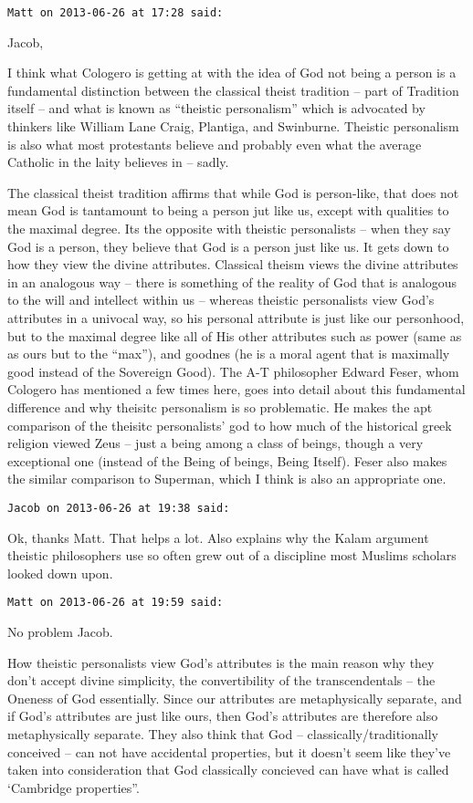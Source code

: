 \begin{footnotesize}
\begin{sffamily}
\hfill

\texttt{Matt on 2013-06-26 at 17:28 said: }

Jacob,

I think what Cologero is getting at with the idea of God not being a person is a fundamental distinction between the classical theist tradition – part of Tradition itself – and what is known as “theistic personalism” which is advocated by thinkers like William Lane Craig, Plantiga, and Swinburne. Theistic personalism is also what most protestants believe and probably even what the average Catholic in the laity believes in – sadly.

The classical theist tradition affirms that while God is person-like, that does not mean God is tantamount to being a person jut like us, except with qualities to the maximal degree. Its the opposite with theistic personalists – when they say God is a person, they believe that God is a person just like us. It gets down to how they view the divine attributes. Classical theism views the divine attributes in an analogous way – there is something of the reality of God that is analogous to the will and intellect within us – whereas theistic personalists view God's attributes in a univocal way, so his personal attribute is just like our personhood, but to the maximal degree like all of His other attributes such as power (same as as ours but to the “max”), and goodnes (he is a moral agent that is maximally good instead of the Sovereign Good). The A-T philosopher Edward Feser, whom Cologero has mentioned a few times here, goes into detail about this fundamental difference and why theisitc personalism is so problematic. He makes the apt comparison of the theisitc personalists' god to how much of the historical greek religion viewed Zeus – just a being among a class of beings, though a very exceptional one (instead of the Being of beings, Being Itself). Feser also makes the similar comparison to Superman, which I think is also an appropriate one.


\hfill

\texttt{Jacob on 2013-06-26 at 19:38 said: }

Ok, thanks Matt. That helps a lot. Also explains why the Kalam argument theistic philosophers use so often grew out of a discipline most Muslims scholars looked down upon.


\hfill

\texttt{Matt on 2013-06-26 at 19:59 said: }

No problem Jacob.

How theistic personalists view God's attributes is the main reason why they don't accept divine simplicity, the convertibility of the transcendentals – the Oneness of God essentially. Since our attributes are metaphysically separate, and if God's attributes are just like ours, then God's attributes are therefore also metaphysically separate. They also think that God – classically/traditionally conceived – can not have accidental properties, but it doesn't seem like they've taken into consideration that God classically concieved can have what is called `Cambridge properties”. 


\end{sffamily}
\end{footnotesize}
